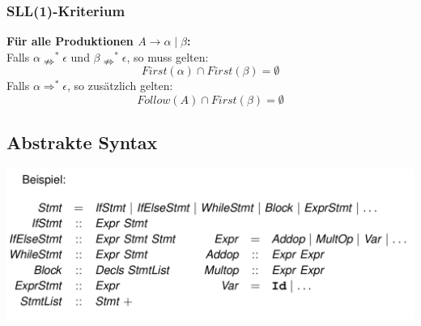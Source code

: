 \subsubsection{SLL(1)-Kriterium}
\textbf{Für alle Produktionen $A \rightarrow \alpha \mid \beta$:}\\
Falls $\alpha \nRightarrow^{*} \epsilon$ und $\beta \nRightarrow^{*} \epsilon$, so muss gelten:
$$First(\alpha) \cap First(\beta) = \emptyset$$
Falls $\alpha \Rightarrow^{*} \epsilon$, so zusätzlich gelten:
$$Follow(A) \cap First(\beta) = \emptyset$$
\subsection{Abstrakte Syntax}
\includegraphics[width=\columnwidth]{images/abstract_syntax.png}